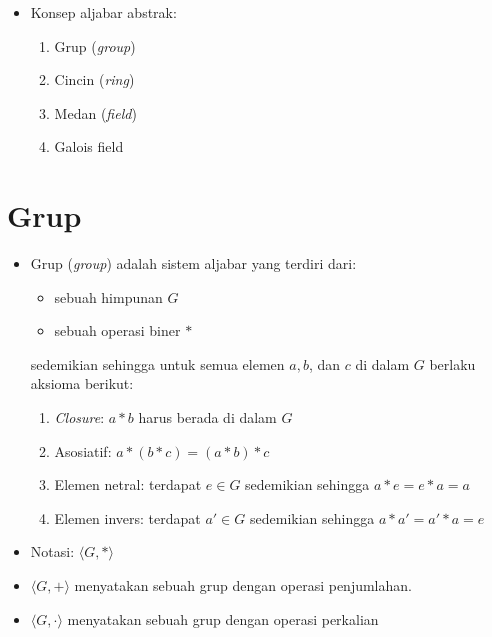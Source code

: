 \documentclass{article}
\begin{document}
\begin{itemize}
    \item Konsep aljabar abstrak:
    \begin{enumerate}
        \item Grup (\textit{group})
        \item Cincin (\textit{ring})
        \item Medan (\textit{field})
        \item Galois field
    \end{enumerate}
\end{itemize}

\newpage


\section*{Grup}

\begin{itemize}
    \item Grup (\textit{group}) adalah sistem aljabar yang terdiri dari:
    \begin{itemize}
        \item sebuah himpunan $G$
        \item sebuah operasi biner $*$
    \end{itemize}
    sedemikian sehingga untuk semua elemen $a, b$, dan $c$ di dalam $G$ berlaku aksioma berikut:
    \begin{enumerate}
        \item \textit{Closure}: $a * b$ harus berada di dalam $G$
        \item Asosiatif: $a * (b * c) = (a * b) * c$
        \item Elemen netral: terdapat $e \in G$ sedemikian sehingga $a * e = e * a = a$
        \item Elemen invers: terdapat $a' \in G$ sedemikian sehingga $a * a' = a' * a = e$
    \end{enumerate}
    \item Notasi: $\langle G, *\rangle$
\end{itemize}

\newpage


\begin{itemize}
  \item $\langle G, + \rangle$ menyatakan sebuah grup dengan operasi penjumlahan.
  \item $\langle G, \cdot \rangle$ menyatakan sebuah grup dengan operasi perkalian
\end{itemize}
\end{document}
